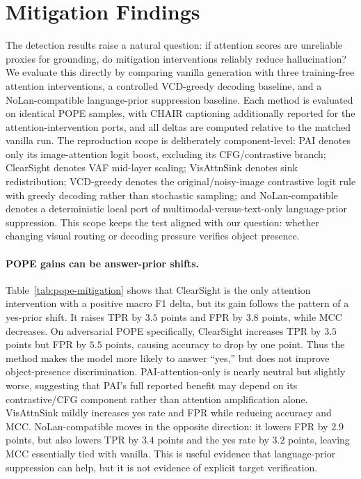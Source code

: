 \section{Mitigation Findings}
\label{sec:mitigation}

The detection results raise a natural question: if attention scores are unreliable proxies for grounding, do mitigation interventions reliably reduce hallucination? We evaluate this directly by comparing vanilla generation with three training-free attention interventions, a controlled VCD-greedy decoding baseline, and a NoLan-compatible language-prior suppression baseline. Each method is evaluated on identical POPE samples, with CHAIR captioning additionally reported for the attention-intervention ports, and all deltas are computed relative to the matched vanilla run.
The reproduction scope is deliberately component-level: PAI denotes only its image-attention logit boost, excluding its CFG/contrastive branch; ClearSight denotes VAF mid-layer scaling; VisAttnSink denotes sink redistribution; VCD-greedy denotes the original/noisy-image contrastive logit rule with greedy decoding rather than stochastic sampling; and NoLan-compatible denotes a deterministic local port of multimodal-versus-text-only language-prior suppression. This scope keeps the test aligned with our question: whether changing visual routing or decoding pressure verifies object presence.







\paragraph{POPE gains can be answer-prior shifts.} Table~\ref{tab:pope-mitigation} shows that ClearSight is the only attention intervention with a positive macro F1 delta, but its gain follows the pattern of a yes-prior shift. It raises TPR by $3.5$ points and FPR by $3.8$ points, while MCC decreases. On adversarial POPE specifically, ClearSight increases TPR by $3.5$ points but FPR by $5.5$ points, causing accuracy to drop by one point. Thus the method makes the model more likely to answer ``yes,'' but does not improve object-presence discrimination. PAI-attention-only is nearly neutral but slightly worse, suggesting that PAI's full reported benefit may depend on its contrastive/CFG component rather than attention amplification alone. VisAttnSink mildly increases yes rate and FPR while reducing accuracy and MCC. NoLan-compatible moves in the opposite direction: it lowers FPR by $2.9$ points, but also lowers TPR by $3.4$ points and the yes rate by $3.2$ points, leaving MCC essentially tied with vanilla. This is useful evidence that language-prior suppression can help, but it is not evidence of explicit target verification.

